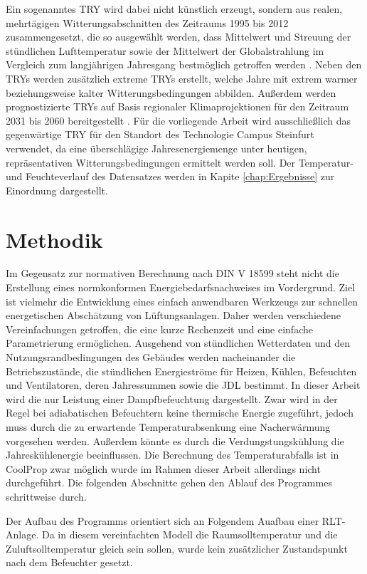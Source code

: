 \documentclass{scrreprt}
\begin{document}
Ein sogenanntes \ac{TRY} wird dabei nicht künstlich erzeugt, sondern
aus realen, mehrtägigen Witterungsabschnitten des Zeitraums 1995 bis
2012 zusammengesetzt, die so ausgewählt werden, dass Mittelwert und
Streuung der stündlichen Lufttemperatur sowie der Mittelwert der
Globalstrahlung im Vergleich zum langjährigen Jahresgang
bestmöglich getroffen werden \parencite{DWDBBR2017}. Neben den \acp{TRY} werden zusätzlich extreme \acp{TRY} erstellt, welche Jahre mit extrem warmer beziehungsweise kalter Witterungsbedingungen abbilden. Außerdem werden prognostizierte \acp{TRY} auf Basis regionaler
Klimaprojektionen für den Zeitraum 2031 bis 2060 bereitgestellt
\parencite{DWDBBR2017}. Für die vorliegende Arbeit wird ausschließlich
das gegenwärtige \ac{TRY} für den Standort des Technologie Campus Steinfurt verwendet, da eine überschlägige
Jahresenergiemenge unter heutigen, repräsentativen
Witterungsbedingungen ermittelt werden soll. Der Temperatur-und Feuchteverlauf des Datensatzes werden in Kapite \ref{chap:Ergebnisse} zur Einordnung dargestellt.

\chapter{Methodik}\label{chap:Methodik}

Im Gegensatz zur normativen Berechnung nach DIN V 18599 steht nicht die Erstellung eines normkonformen Energiebedarfsnachweises im Vordergrund. Ziel ist vielmehr die Entwicklung eines einfach anwendbaren Werkzeugs zur schnellen energetischen Abschätzung von Lüftungsanlagen. Daher werden verschiedene Vereinfachungen getroffen, die eine kurze Rechenzeit und eine einfache Parametrierung ermöglichen. Ausgehend von stündlichen
Wetterdaten und den Nutzungsrandbedingungen des Gebäudes werden
nacheinander die Betriebszustände, die stündlichen Energieströme für
Heizen, Kühlen, Befeuchten und Ventilatoren, deren Jahressummen sowie
die \ac{JDL} bestimmt. In dieser Arbeit wird die nur Leistung einer Dampfbefeuchtung dargestellt. Zwar wird in der Regel bei adiabatischen Befeuchtern keine thermische Energie zugeführt, jedoch muss durch die zu erwartende Temperaturabsenkung eine Nacherwärmung vorgesehen werden. Außerdem könnte es durch die Verdungstungskühlung die Jahreskühlenergie beeinflussen. Die Berechnung des Temperaturabfalls ist in CoolProp zwar möglich wurde im Rahmen dieser Arbeit allerdings nicht durchgeführt. Die folgenden Abschnitte gehen den Ablauf des Programmes schrittweise durch.

Der Aufbau des Programms orientiert sich an Folgendem Auafbau einer RLT-Anlage. Da in diesem vereinfachten Modell die Raumsolltemperatur und die Zuluftsolltemperatur gleich sein sollen, wurde kein zusätzlicher Zustandspunkt nach dem Befeuchter gesetzt.
\end{document}
